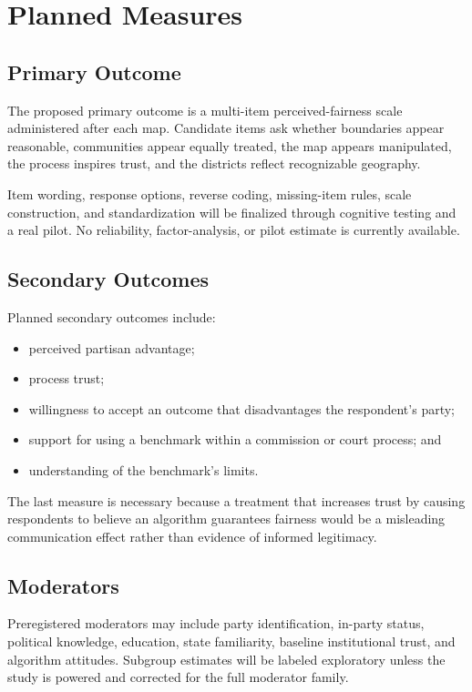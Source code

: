 \section{Planned Measures}
\label{sec:measures}

\subsection{Primary Outcome}

The proposed primary outcome is a multi-item perceived-fairness scale
administered after each map. Candidate items ask whether boundaries appear
reasonable, communities appear equally treated, the map appears manipulated,
the process inspires trust, and the districts reflect recognizable geography.

Item wording, response options, reverse coding, missing-item rules, scale
construction, and standardization will be finalized through cognitive testing
and a real pilot. No reliability, factor-analysis, or pilot estimate is
currently available.

\subsection{Secondary Outcomes}

Planned secondary outcomes include:

\begin{itemize}
\item perceived partisan advantage;
\item process trust;
\item willingness to accept an outcome that disadvantages the respondent's
party;
\item support for using a benchmark within a commission or court process; and
\item understanding of the benchmark's limits.
\end{itemize}

The last measure is necessary because a treatment that increases trust by
causing respondents to believe an algorithm guarantees fairness would be a
misleading communication effect rather than evidence of informed legitimacy.

\subsection{Moderators}

Preregistered moderators may include party identification, in-party status,
political knowledge, education, state familiarity, baseline institutional
trust, and algorithm attitudes. Subgroup estimates will be labeled exploratory
unless the study is powered and corrected for the full moderator family.

